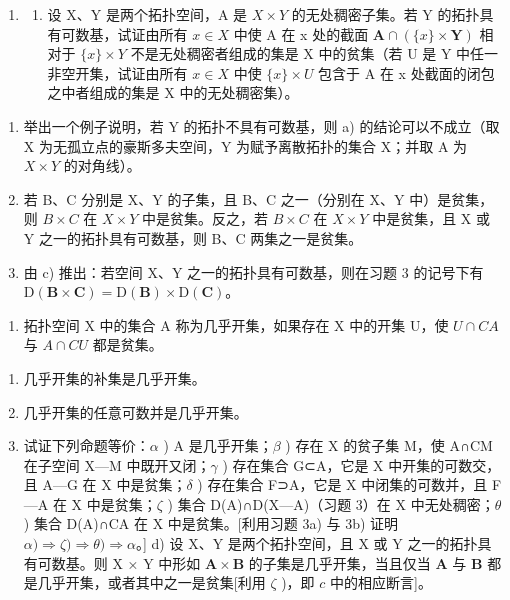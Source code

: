 \begin{enumerate}
\def\labelenumi{\arabic{enumi})}
\setcounter{enumi}{4}
\tightlist
\item
  \begin{enumerate}
  \def\labelenumii{\alph{enumii})}
  \tightlist
  \item
    设 X、Y 是两个拓扑空间，A 是 \(X \times Y\) 的无处稠密子集。若 Y 的拓扑具有可数基，试证由所有 \(x \in X\) 中使 A 在 x 处的截面 \(\mathbf{A} \cap (\{x\} \times \mathbf{Y})\) 相对于 \(\{x\} \times Y\) 不是无处稠密者组成的集是 X 中的贫集（若 U 是 Y 中任一非空开集，试证由所有 \(x \in X\) 中使 \(\{x\} \times U\) 包含于 A 在 x 处截面的闭包之中者组成的集是 X 中的无处稠密集）。
  \end{enumerate}
\end{enumerate}

\begin{enumerate}
\def\labelenumi{\alph{enumi})}
\setcounter{enumi}{1}
\item
  举出一个例子说明，若 Y 的拓扑不具有可数基，则 a) 的结论可以不成立（取 X 为无孤立点的豪斯多夫空间，Y 为赋予离散拓扑的集合 X；并取 A 为 \(X \times Y\) 的对角线）。
\item
  若 B、C 分别是 X、Y 的子集，且 B、C 之一（分别在 X、Y 中）是贫集，则 \(B \times C\) 在 \(X \times Y\) 中是贫集。反之，若 \(B \times C\) 在 \(X \times Y\) 中是贫集，且 X 或 Y 之一的拓扑具有可数基，则 B、C 两集之一是贫集。
\item
  由 c) 推出：若空间 X、Y 之一的拓扑具有可数基，则在习题 3 的记号下有 \(\mathrm{D}(\mathbf{B} \times \mathbf{C}) = \mathrm{D}(\mathbf{B}) \times \mathrm{D}(\mathbf{C})\)。
\end{enumerate}

\begin{enumerate}
\def\labelenumi{\arabic{enumi})}
\setcounter{enumi}{5}
\tightlist
\item
  拓扑空间 X 中的集合 A 称为几乎开集，如果存在 X 中的开集 U，使 \(U \cap C A\) 与 \(A \cap C U\) 都是贫集。
\end{enumerate}

\begin{enumerate}
\def\labelenumi{\alph{enumi})}
\item
  几乎开集的补集是几乎开集。
\item
  几乎开集的任意可数并是几乎开集。
\item
  试证下列命题等价：\(\alpha\) ) A 是几乎开集；\(\beta\) ) 存在 X 的贫子集 M，使 A∩CM 在子空间 X---M 中既开又闭；\(\gamma\) ) 存在集合 G⊂A，它是 X 中开集的可数交，且 A---G 在 X 中是贫集；\(\delta\) ) 存在集合 F⊃A，它是 X 中闭集的可数并，且 F---A 在 X 中是贫集；\(\zeta\) ) 集合 D(A)∩D(X---A)（习题 3）在 X 中无处稠密；\(\theta\) ) 集合 D(A)∩CA 在 X 中是贫集。{[}利用习题 3a) 与 3b) 证明 \(\alpha)\Longrightarrow\zeta)\Longrightarrow\theta)\Longrightarrow\alpha\)。{]} d) 设 X、Y 是两个拓扑空间，且 X 或 Y 之一的拓扑具有可数基。则 X × Y 中形如 \(\mathbf{A} \times \mathbf{B}\) 的子集是几乎开集，当且仅当 \(\mathbf{A}\) 与 \(\mathbf{B}\) 都是几乎开集，或者其中之一是贫集{[}利用 \(\zeta\) )，即 \(c\) 中的相应断言{]}。
\end{enumerate}

